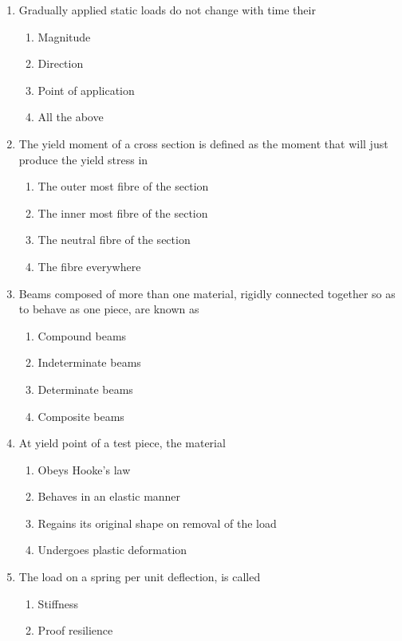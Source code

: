 \documentclass[11pt,a4paper]{article}
\begin{document}
\begin{enumerate}
\item{Gradually applied static loads do not change with time their}
\begin{enumerate}[label=\Alph*.]
\item{Magnitude}
\item{Direction}
\item{Point of application}
\item{All the above}
\end{enumerate}
\item{The yield moment of a cross section is defined as the moment that will just produce the yield stress in}
\begin{enumerate}[label=\Alph*.]
\item{The outer most fibre of the section}
\item{The inner most fibre of the section}
\item{The neutral fibre of the section}
\item{The fibre everywhere}
\end{enumerate}
\item{Beams composed of more than one material, rigidly connected together so as to behave as one piece, are known as}
\begin{enumerate}[label=\Alph*.]
\item{Compound beams}
\item{Indeterminate beams}
\item{Determinate beams}
\item{Composite beams}
\end{enumerate}
\item{At yield point of a test piece, the material}
\begin{enumerate}[label=\Alph*.]
\item{Obeys Hooke's law}
\item{Behaves in an elastic manner}
\item{Regains its original shape on removal of the load}
\item{Undergoes plastic deformation}
\end{enumerate}
\item{The load on a spring per unit deflection, is called}
\begin{enumerate}[label=\Alph*.]
\item{Stiffness}
\item{Proof resilience}

\end{enumerate}
\end{enumerate}
\end{document}
